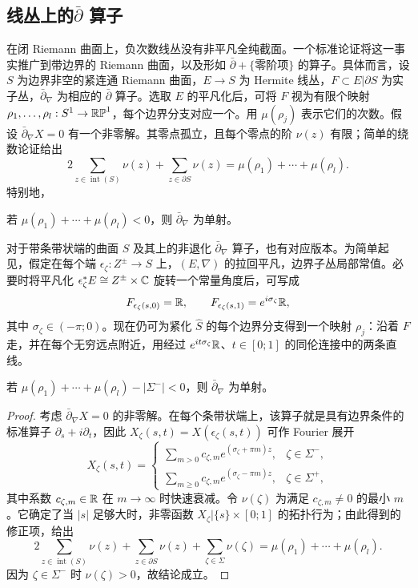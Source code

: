 \subsection{线丛上的\texorpdfstring{$\bar\partial$}{∂̄} 算子}\label{sec:11d}
在闭 Riemann 曲面上，负次数线丛没有非平凡全纯截面。一个标准论证将这一事实推广到带边界的 Riemann 曲面，以及形如
$\bar\partial+\{\text{零阶项}\}$ 的算子。具体而言，设 $S$ 为边界非空的紧连通 Riemann 曲面，$E\to S$ 为 Hermite 线丛，$F\subset E|\partial S$ 为实子丛，$\bar\partial_\nabla$ 为相应的 $\bar\partial$ 算子。选取 $E$ 的平凡化后，可将 $F$ 视为有限个映射 $\rho_1,\allowbreak \ldots,\allowbreak \rho_l:S^1\to\mathbb{RP}^1$，每个边界分支对应一个。用 $\mu(\rho_j)$ 表示它们的次数。假设 $\bar\partial_\nabla X=0$ 有一个非零解。其零点孤立，且每个零点的阶 $\nu(z)$ 有限；简单的绕数论证给出
\begin{equation}\label{eq:11.13}
2\sum_{z\in\operatorname{int}(S)}\nu(z)+\sum_{z\in\partial S}\nu(z)=\mu(\rho_1)+\cdots+\mu(\rho_l).
\end{equation}
特别地，
\begin{lemma}\label{st:11.4}
若 $\mu(\rho_1)+\cdots+\mu(\rho_l)<0$，则 $\bar\partial_\nabla$ 为单射。
\end{lemma}
对于带条带状端的曲面 $S$ 及其上的非退化 $\bar\partial_\nabla$ 算子，也有对应版本。为简单起见，假定在每个端 $\epsilon_\zeta:Z^\pm\to S$ 上，$(E,\allowbreak \nabla)$ 的拉回平凡，边界子丛局部常值。必要时将平凡化 $\epsilon_\zeta^*E\cong Z^\pm\times\mathbb C$ 旋转一个常量角度后，可写成
\begin{equation}\label{eq:11.14}
F_{\epsilon_\zeta(s,0)}=\mathbb R,\qquad F_{\epsilon_\zeta(s,1)}=e^{i\sigma_\zeta}\mathbb R,
\end{equation}
其中 $\sigma_\zeta\in(-\pi;0)$。现在仍可为紧化 $\hat S$ 的每个边界分支得到一个映射 $\rho_j$：沿着 $F$ 走，并在每个无穷远点附近，用经过 $e^{it\sigma_\zeta}\mathbb R$、$t\in[0;1]$ 的同伦连接中的两条直线。
\begin{lemma}\label{st:11.5}
若 $\mu(\rho_1)+\cdots+\mu(\rho_l)-|\Sigma^-|<0$，则 $\bar\partial_\nabla$ 为单射。
\end{lemma}
\begin{proof}
考虑 $\bar\partial_\nabla X=0$ 的非零解。在每个条带状端上，该算子就是具有边界条件的标准算子 $\partial_s+i\partial_t$，因此 $X_\zeta(s,\allowbreak t)=X(\epsilon_\zeta(s,\allowbreak t))$ 可作 Fourier 展开
\[
X_\zeta(s,t)=\begin{cases}
\sum_{m>0}c_{\zeta,m}e^{(\sigma_\zeta+\pi m)z},&\zeta\in\Sigma^-,\\
\sum_{m\geq0}c_{\zeta,m}e^{(\sigma_\zeta-\pi m)z},&\zeta\in\Sigma^+,
\end{cases}
\]
其中系数 $c_{\zeta,\allowbreak m}\in\mathbb R$ 在 $m\to\infty$ 时快速衰减。令 $\nu(\zeta)$ 为满足 $c_{\zeta,\allowbreak m}\ne0$ 的最小 $m$。它确定了当 $|s|$ 足够大时，非零函数 $X_\zeta|\{s\}\times[0;1]$ 的拓扑行为；由此得到的修正项，给出
\[
2\sum_{z\in\operatorname{int}(S)}\nu(z)+\sum_{z\in\partial S}\nu(z)+\sum_{\zeta\in\Sigma}\nu(\zeta)=\mu(\rho_1)+\cdots+\mu(\rho_l).
\]
因为 $\zeta\in\Sigma^-$ 时 $\nu(\zeta)>0$，故结论成立。
\end{proof}
